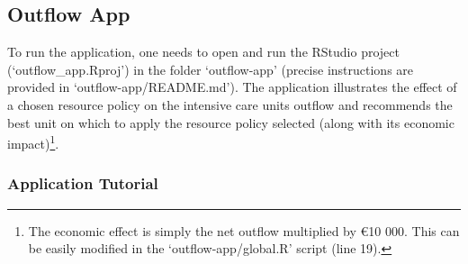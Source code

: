 \documentclass[12pt]{article}
\begin{document}
\subsection*{Outflow App}

To run the application, one needs to open and run the RStudio project (`outflow\_app.Rproj') in the folder `outflow-app' (precise instructions are provided in `outflow-app/README.md'). The application illustrates the effect of a chosen resource policy on the intensive care units outflow and recommends the best unit on which to apply the resource policy selected (along with its economic impact)\footnote{The economic effect is simply the net outflow multiplied by \euro10 000. This can be easily modified in the `outflow-app/global.R' script (line 19). }. 

\subsubsection*{Application Tutorial}
\end{document}
